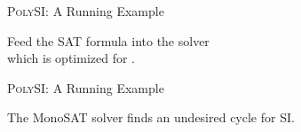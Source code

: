 \begin{frame}{\textsc{PolySI}: A Running Example}
	\begin{center}
		Feed the SAT formula into the  solver~ \\[2pt]
		which is optimized for .

		\vspace{0.20cm}
	\end{center}
\end{frame}

\begin{frame}{\textsc{PolySI}: A Running Example}
	\begin{center}

		\vspace{0.20cm}
		The MonoSAT solver finds an undesired cycle for SI.
	\end{center}
\end{frame}
